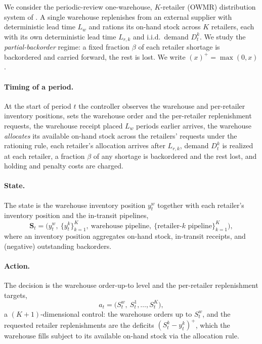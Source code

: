 We consider the periodic-review one-warehouse, $K$-retailer (OWMR) distribution system of
\citet{kaynov2024owmr}. A single warehouse replenishes from an external supplier with deterministic
lead time $L_w$ and rations its on-hand stock across $K$ retailers, each with its own deterministic
lead time $L_{r,k}$ and i.i.d.\ demand $D^k_t$. We study the \emph{partial-backorder} regime: a fixed
fraction $\beta$ of each retailer shortage is backordered and carried forward, the rest is lost. We
write $(x)^+=\max(0,x)$.

\paragraph{Timing of a period.}
At the start of period $t$ the controller observes the warehouse and per-retailer inventory positions,
sets the warehouse order and the per-retailer replenishment requests, the warehouse receipt placed
$L_w$ periods earlier arrives, the warehouse \emph{allocates} its available on-hand stock across the
retailers' requests under the rationing rule, each retailer's allocation arrives after $L_{r,k}$,
demand $D^k_t$ is realized at each retailer, a fraction $\beta$ of any shortage is backordered and the
rest lost, and holding and penalty costs are charged.

\paragraph{State.}
The state is the warehouse inventory position $y^w_t$ together with each retailer's inventory
position and the in-transit pipelines,
\begin{equation*}
    \mathbf{S}_t=\bigl(y^w_t,\ \{y^k_t\}_{k=1}^{K},\ \text{warehouse pipeline},\ \{\text{retailer-}k\text{ pipeline}\}_{k=1}^{K}\bigr),
\end{equation*}
where an inventory position aggregates on-hand stock, in-transit receipts, and (negative) outstanding
backorders.

\paragraph{Action.}
The decision is the warehouse order-up-to level and the per-retailer replenishment targets,
\begin{equation*}
    a_t=\bigl(S^w_t,\ S^1_t,\dots,S^K_t\bigr),
\end{equation*}
a $(K{+}1)$-dimensional control: the warehouse orders up to $S^w_t$, and the requested retailer
replenishments are the deficits $(S^k_t-y^k_t)^+$, which the warehouse fills subject to its available
on-hand stock via the allocation rule.

